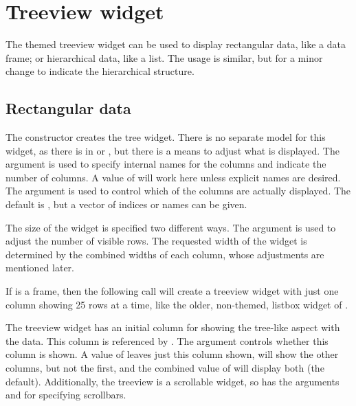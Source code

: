 \section{Treeview widget}
\label{sec:tcltk:treeview-widget}

The themed treeview widget can be used to display rectangular data,
like a data frame; or hierarchical data, like a list. The usage is
similar, but for a minor change to indicate the hierarchical structure.

\subsection{Rectangular data}


The  constructor creates the tree
widget. There is no separate model for this widget, as there is in
\GTK{} or \Qt, but there is a means to adjust what is displayed.  The
argument  is used to specify internal
names for the columns and indicate the number of columns. A value of
 will work here unless explicit names are desired. The
argument  is used to control
which of the columns are actually displayed. The default is
, but a vector of indices or names can be given.  

The size of the widget is specified two different ways.  The
 argument is used to adjust the number
of visible rows. The requested width of the widget is determined by
the combined widths of each column, whose adjustments are mentioned
later.



If  is a frame, then the following call will create a treeview
widget with just one column showing 25 rows at a time, like the older,
non-themed, listbox widget of \Tk.

\begin{Schunk}
\end{Schunk}



The treeview widget has an initial column for showing the tree-like
aspect with the data. This column is referenced by . The
 argument controls whether this column is
shown. A value of  leaves just this column shown,
 will show the other columns, but not the first, and
the combined value of  will display both (the
default).  Additionally, the treeview is a scrollable widget, so has
the arguments  and
 for specifying scrollbars.

